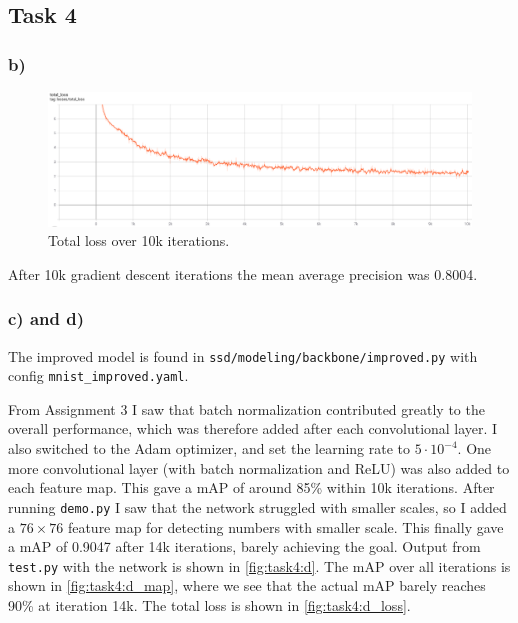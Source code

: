 \subsection*{Task 4}

\subsubsection*{b)}

\begin{figure}[h!]
  \centering
  \includegraphics[width=\textwidth]{figures/total_loss.png}
  \caption{Total loss over 10k iterations.}
  \label{fig:task4:b}
\end{figure}

After 10k gradient descent iterations the mean average precision was 0.8004.


\subsubsection*{c) and d)}

The improved model is found in \texttt{ssd/modeling/backbone/improved.py} with config \texttt{mnist\_improved.yaml}. 

From Assignment 3 I saw that batch normalization contributed greatly to the overall performance, which was therefore added after each convolutional layer. I also switched to the Adam optimizer, and set the learning rate to $5\cdot10^{-4}$. One more convolutional layer (with batch normalization and ReLU) was also added to each feature map. This gave a mAP of around 85\% within 10k iterations. After running \texttt{demo.py} I saw that the network struggled with smaller scales, so I added a $76\times76$ feature map for detecting numbers with smaller scale. This finally gave a mAP of 0.9047 after 14k iterations, barely achieving the goal. Output from \texttt{test.py} with the network is shown in \cref{fig:task4:d}. The mAP over all iterations is shown in \cref{fig:task4:d_map}, where we see that the actual mAP barely reaches 90\% at iteration 14k. The total loss is shown in \cref{fig:task4:d_loss}.

